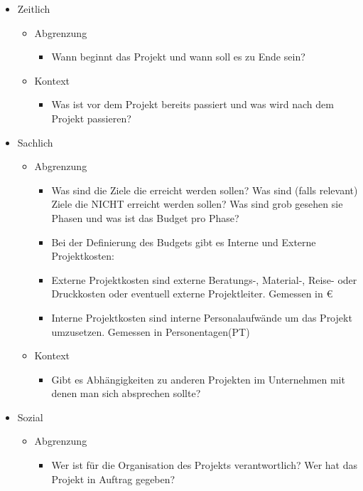 \documentclass{article}
\begin{document}
	\begin{itemize}
		\item{Zeitlich}
		\begin{itemize}
			\item{Abgrenzung}
			\begin{itemize}
				\item{Wann beginnt das Projekt und wann soll es zu Ende sein?}
			\end{itemize}
			\item{Kontext}
			\begin{itemize}
				\item{Was ist vor dem Projekt bereits passiert und was wird nach dem Projekt passieren?}
			\end{itemize}
		\end{itemize}
		\item{Sachlich}
		\begin{itemize}
			\item{Abgrenzung}
			\begin{itemize}
				\item{Was sind die Ziele die erreicht werden sollen? Was sind (falls relevant) Ziele die NICHT erreicht werden sollen? Was sind grob gesehen sie Phasen und was ist das Budget pro Phase?}
				\item{Bei der Definierung des Budgets gibt es Interne und Externe Projektkosten:}
				\item{Externe Projektkosten sind externe Beratungs-, Material-, Reise- oder Druckkosten oder eventuell externe Projektleiter. Gemessen in €}
				\item{Interne Projektkosten sind interne Personalaufwände um das Projekt umzusetzen. Gemessen in Personentagen(PT)}
			\end{itemize}
			\item{Kontext}
			\begin{itemize}
				\item{Gibt es Abhängigkeiten zu anderen Projekten im Unternehmen mit denen man sich absprechen sollte?}
			\end{itemize}
		\end{itemize}
		\item{Sozial}
		\begin{itemize}
			\item{Abgrenzung}
			\begin{itemize}
				\item{Wer ist für die Organisation des Projekts verantwortlich? Wer hat das Projekt in Auftrag gegeben?}
			\end{itemize}

\end{itemize}
\end{itemize}
\end{document}
